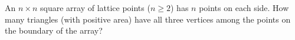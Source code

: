 An $n\times n$ square array of lattice points ($n\ge2$) has $n$ points on each side. How many triangles (with positive area) have all three vertices among the points on the boundary of the array?
